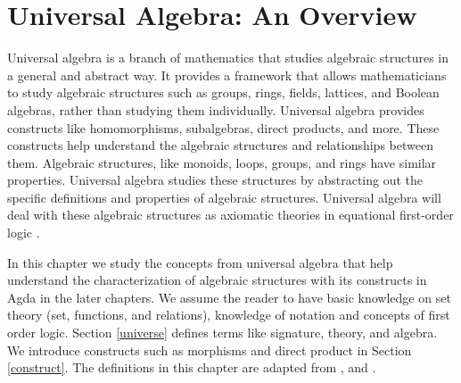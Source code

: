 \chapter{Universal Algebra: An Overview}
\label{start}
Universal algebra is a branch of mathematics that studies algebraic structures
in a general and abstract way. It provides a framework that allows
mathematicians to study algebraic structures such as groups, rings, fields,
lattices, and Boolean algebras, rather than studying them individually.
Universal algebra provides constructs like homomorphisms, subalgebras, direct
products, and more. These constructs help understand the algebraic structures
and relationships between them. Algebraic structures, like monoids, loops,
groups, and rings have similar properties. Universal algebra studies these
structures by abstracting out the specific definitions and properties of
algebraic structures. Universal algebra will deal with these algebraic
structures as axiomatic theories in equational first-order logic
\cite{YSharoda}. 

In this chapter we study the concepts from universal algebra that help
understand the characterization of algebraic structures with its constructs in
Agda in the later chapters. We assume the reader to have basic knowledge on set
theory (set, functions, and relations), knowledge of notation and concepts of
first order logic. Section \ref{universe} defines terms like signature, theory,
and algebra. We introduce constructs such as morphisms and direct product in
Section \ref{construct}. The definitions in this chapter are adapted from
\cite{sankappanavar1981course}, \cite{wechler2012universal} and
\cite{sannella2012foundations}. 

